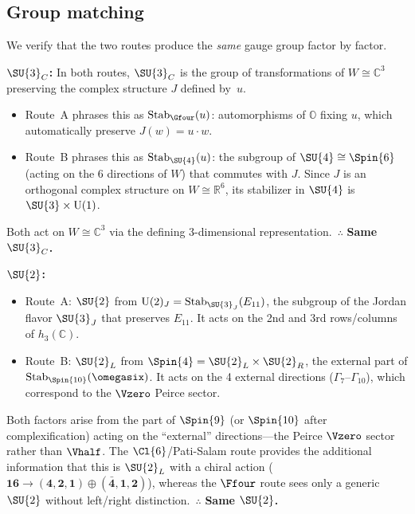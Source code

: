 \subsection{Group matching}\label{sec:group-matching}

We verify that the two routes produce the \emph{same} gauge group
factor by factor.

\medskip
\noindent\textbf{$\SU{3}_C$:}
In both routes, $\SU{3}_C$ is the group of transformations of
$W\cong\mathbb{C}^3$ preserving the complex structure $J$ defined
by~$u$.
\begin{itemize}
  \item Route~A phrases this as $\mathrm{Stab}_{\Gfour}(u)$:
    automorphisms of $\mathbb{O}$ fixing $u$, which automatically
    preserve $J(w)=u\cdot w$.
  \item Route~B phrases this as $\mathrm{Stab}_{\SU{4}}(u)$:
    the subgroup of $\SU{4}\cong\Spin{6}$ (acting on the 6
    directions of $W$) that commutes with $J$.  Since $J$ is
    an orthogonal complex structure on $W\cong\mathbb{R}^6$,
    its stabilizer in $\SU{4}$ is $\SU{3}\times\mathrm{U}(1)$.
\end{itemize}
Both act on $W\cong\mathbb{C}^3$ via the defining 3-dimensional
representation.\ $\therefore$ \textbf{Same $\SU{3}_C$.}

\medskip
\noindent\textbf{$\SU{2}$:}
\begin{itemize}
  \item Route~A: $\SU{2}$ from
    $\mathrm{U}(2)_J = \mathrm{Stab}_{\SU{3}_J}(E_{11})$,
    the subgroup of the Jordan flavor $\SU{3}_J$ that preserves
    $E_{11}$.  It acts on the 2nd and 3rd rows/columns of
    $h_3(\mathbb{C})$.
  \item Route~B: $\SU{2}_L$ from
    $\Spin{4} = \SU{2}_L\times\SU{2}_R$, the external part of
    $\mathrm{Stab}_{\Spin{10}}(\omegasix)$.  It acts on the 4
    external directions ($\Gamma_7$--$\Gamma_{10}$), which
    correspond to the $\Vzero$ Peirce sector.
\end{itemize}
Both factors arise from the part of $\Spin{9}$ (or $\Spin{10}$
after complexification) acting on the ``external'' directions---the
Peirce $\Vzero$ sector rather than $\Vhalf$.
The $\Cl{6}$/Pati-Salam route provides the additional information
that this is $\SU{2}_L$ with a chiral action
($\mathbf{16}\to(\mathbf{4},\mathbf{2},\mathbf{1})\oplus(\bar{\mathbf{4}},\mathbf{1},\mathbf{2})$),
whereas the $\Ffour$ route sees only a generic $\SU{2}$ without
left/right distinction.\ $\therefore$ \textbf{Same $\SU{2}$.}

